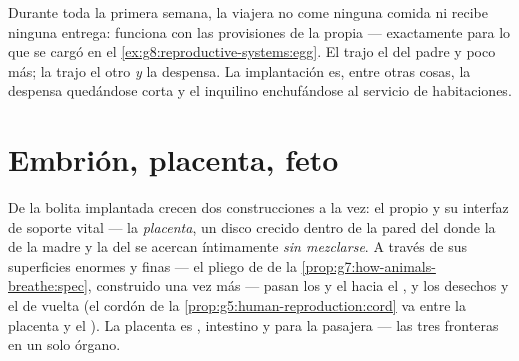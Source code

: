 \begin{example}\label{ex:g8:from-egg-to-birth:provisions}
Durante toda la primera semana, la viajera no come ninguna comida ni
recibe ninguna entrega: funciona con las provisiones de la propia
  --- exactamente para lo que se cargó en el
\cref{ex:g8:reproductive-systems:egg}. El  trajo el
 del padre y poco más; la   trajo el otro 
\emph{y} la despensa. La implantación es, entre otras cosas, la
despensa quedándose corta y el inquilino enchufándose al servicio de
habitaciones.
\end{example}

\section{Embrión, placenta, feto}

\begin{definition}[La placenta]\label{def:g8:from-egg-to-birth:placenta}
De la bolita implantada crecen dos construcciones a la vez: el propio
\emph{} y su interfaz de soporte vital --- la
\emph{placenta}, un disco crecido dentro de la pared
del  donde la  de la madre y la  del  se
acercan íntimamente \emph{sin mezclarse}. A través de sus superficies
enormes y finas --- el pliego de  de la
\cref{prop:g7:how-animals-breathe:spec}, construido una vez más ---
pasan los  y el  hacia el , y los desechos y el
 de vuelta (el cordón de la
\cref{prop:g5:human-reproduction:cord} va entre la placenta y el
). La placenta es , intestino y  para la pasajera ---
las tres fronteras en un solo órgano.
\end{definition}

